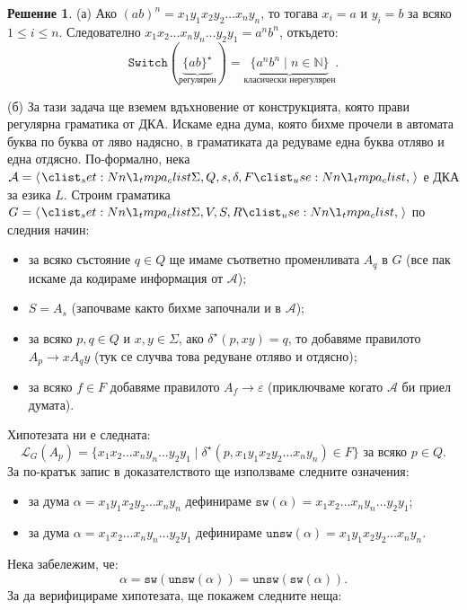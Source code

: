 \documentclass[12pt]{article}
\newcommand{\N}{\mathbb{N}}
\newcommand{\calA}{\mathcal{A}}
\newcommand{\calL}{\mathcal{L}}
\theoremstyle{definition}
\newtheorem*{solution}{Решение}
\begin{document}
\begin{solution}
  \phantom{0}

  (а) Ако $(ab)^n = x_1 y_1 x_2 y_2 \dots x_n y_n$, то тогава $x_i = a$ и $y_i = b$ за всяко $1 \leq i \leq n$.
  Следователно $x_1 x_2 \dots x_n y_n \dots y_2 y_1 = a^n b^n$, откъдето:
  \[
    \texttt{Switch}(\underbrace{\{ ab \}^\star}_{\text{регулярен}}) = \underbrace{\{ a^n b^n \mid n \in \N \}}_{\text{класически нерегулярен}}.
  \]

  (б) За тази задача ще вземем вдъхновение от конструкцията, която прави регулярна граматика от ДКА.
  Искаме една дума, която бихме прочели в автомата буква по буква от ляво надясно, в граматиката да редуваме една буква отляво и една отдясно.
  По-формално, нека $\calA = \opair{\Sigma, Q, s, \delta, F}$ е ДКА за езика $L$.
  Строим граматика $G = \opair{\Sigma, V, S, R}$ по следния начин:
  \begin{itemize}
    \item за всяко състояние $q \in Q$ ще имаме съответно променливата $A_q$ в $G$ (все пак искаме да кодираме информация от $\calA$);
    \item $S = A_s$ (започваме както бихме започнали и в $\calA$);
    \item за всяко $p, q \in Q$ и $x, y \in \Sigma$, ако $\delta^\star(p, xy) = q$, то добавяме правилото $A_p \longrightarrow x A_q y$ (тук се случва това редуване отляво и отдясно);
    \item за всяко $f \in F$ добавяме правилото $A_f \longrightarrow \varepsilon$ (приключваме когато $\calA$ би приел думата).
  \end{itemize}
  Хипотезата ни е следната:
  \[
    \calL_G(A_p) = \{ x_1 x_2 \dots x_n y_n \dots y_2 y_1 \mid \delta^\star(p, x_1 y_1 x_2 y_2 \dots x_n y_n) \in F \} \text{ за всяко } p \in Q.
  \]
  За по-кратък запис в доказателството ще използваме следните означения:
  \begin{itemize}
    \item за дума $\alpha = x_1 y_1 x_2 y_2 \dots x_n y_n$ дефинираме $\texttt{sw}(\alpha) = x_1 x_2 \dots x_n y_n \dots y_2 y_1$;
    \item за дума $\alpha = x_1 x_2 \dots x_n y_n \dots y_2 y_1$ дефинираме $\texttt{unsw}(\alpha) = x_1 y_1 x_2 y_ 2 \dots x_n y_n$.
  \end{itemize}
  Нека забележим, че:
  \[
    \alpha = \texttt{sw}(\texttt{unsw}(\alpha)) = \texttt{unsw}(\texttt{sw}(\alpha)).
  \]
  За да верифицираме хипотезата, ще покажем следните неща:
  \begin{itemize}

\end{itemize}
\end{solution}
\end{document}
